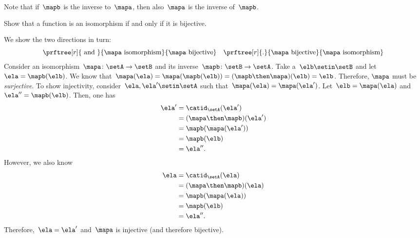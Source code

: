 \begin{remark}
    Note that if~$\mapb$ is the inverse to~$\mapa$, then also~$\mapa$ is the inverse of~$\mapb$.
\end{remark}

\begin{exercise}
    \label{ex:bijective-functions-are-isomorphisms}
    Show that a function is an isomorphism if and only if it is bijective.
\end{exercise}
\begin{solution}
    We show the two directions in turn:
    \begin{equation*}
        \prftree[r]{\text{ and }}{\mapa \text{ isomorphism}}{\mapa \text{ bijective}} \quad \prftree[r]{.
        }{\mapa \text{ bijective}}{\mapa \text{ isomorphism}}
    \end{equation*}
    Consider an isomorphism~$\mapa\colon \setA \to \setB$ and its inverse~$\mapb\colon \setB\to \setA$.
    Take a~$\elb\setin\setB$ and let~$\ela= \mapb(\elb)$.
    We know that~$\mapa(\ela)=\mapa(\mapb(\elb))=(\mapb\then \mapa)(\elb)=\elb$.
    Therefore, $\mapa$ must be \emph{surjective}.
    To show injectivity, consider~$\ela,\ela'\setin\setA$ such that~$\mapa(\ela)=\mapa(\ela')$.
    Let~$\elb=\mapa(\ela)$ and~$\ela''=\mapb(\elb)$.
    Then, one has
    \begin{equation*}
        \begin{aligned}
            \ela' & =\catid_\setA(\ela') \\
                  & =(\mapa \then \mapb)(\ela') \\
                  & =\mapb(\mapa(\ela')) \\
                  & =\mapb(\elb) \\
                  & =\ela''.
        \end{aligned}
    \end{equation*}
    However, we also know
    \begin{equation*}
        \begin{aligned}
            \ela & =\catid_\setA(\ela) \\
                 & =(\mapa \then \mapb)(\ela) \\
                 & =\mapb(\mapa(\ela)) \\
                 & =\mapb(\elb) \\
                 & =\ela''.
        \end{aligned}
    \end{equation*}
    Therefore,~$\ela=\ela'$ and~$\mapa$ is injective (and therefore bijective).


\end{solution}
